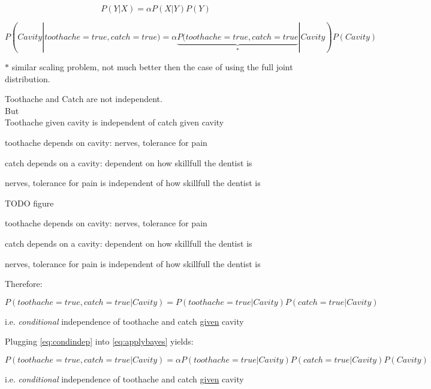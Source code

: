 \begin{frame}\frametitle{\subsecname}

\begin{equation}
P(Y|X) = \alpha P(X|Y)P(Y)
\end{equation}

\begin{equation}
P(Cavity|toothache=true, catch=true) = \alpha \underbrace{P(toothache=true, catch=true}_{*} | Cavity)P(Cavity)
\label{eq:applybayes}
\end{equation}

$*$ similar scaling problem, not much better then the case of using the full joint distribution.


\begin{center}
Toothache and Catch are not independent.\\
But\\
Toothache given cavity is independent of catch given cavity
\end{center}

toothache depends on cavity: nerves, tolerance for pain

catch depends on a cavity: dependent on how skillfull the dentist is

nerves, tolerance for pain is independent of how skillfull the dentist is

TODO figure




\end{frame}

\begin{frame}


toothache depends on cavity: nerves, tolerance for pain

catch depends on a cavity: dependent on how skillfull the dentist is

nerves, tolerance for pain is independent of how skillfull the dentist is


Therefore:

\begin{equation}
P(toothache=true, catch=true | Cavity) = P(toothache=true| Cavity) P(catch=true| Cavity)
\label{eq:condindep}
\end{equation}

i.e. \emph{conditional} independence of toothache and catch \underline{given} cavity

Plugging \eqref{eq:condindep} into \eqref{eq:applybayes} yields:

\begin{equation}
P(toothache=true, catch=true | Cavity) = \alpha P(toothache=true| Cavity) P(catch=true| Cavity) P(Cavity)
\end{equation}

i.e. \emph{conditional} independence of toothache and catch \underline{given} cavity
\end{frame}

